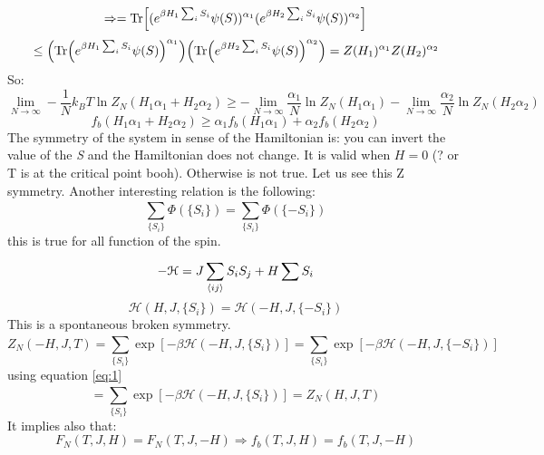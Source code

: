 \documentclass[../main/main.tex]{subfiles}
\begin{document}
\begin{equation}
  \Rightarrow = \Tr[ (e^{\beta H_1 \sum_{i}^{} S_i } \psi (S))^{\alpha _1} (e^{\beta H_2 \sum_{i}^{} S_i } \psi (S))^{\alpha _2}]
\end{equation}
\begin{equation}
  \le \qty(\Tr (e^{\beta H_1 \sum_{i}^{} S_i } \psi (S))^{\alpha _1}  ) \qty(\Tr (e^{\beta H_2 \sum_{i}^{} S_i } \psi (S))^{\alpha _2}  ) = Z(H_1)^{\alpha _1} Z(H_2)^{\alpha _2}
\end{equation}
So:
\begin{equation}
  \lim_{N \rightarrow \infty } - \frac{1}{N} k_B T \ln{Z_N (H_1 \alpha _1 + H_2 \alpha _2)} \ge - \lim_{N \rightarrow \infty } \frac{\alpha _1}{N} \ln{Z_N (H_1 \alpha _1)} -
  \lim_{N \rightarrow \infty } \frac{\alpha _2}{N} \ln{Z_N (H_2 \alpha _2)}
\end{equation}
\begin{equation}
  f_b (H_1 \alpha _1 + H_2 \alpha _2) \ge \alpha _1 f_b (H_1 \alpha _1) +  \alpha _2 f_b (H_2 \alpha _2)
\end{equation}
The symmetry of the system in sense of the Hamiltonian is: you can invert the value of the \emph{S} and the Hamiltonian does not change. It is valid when \( H=0 \) (? or T is at the critical point booh). Otherwise is not true. Let us see this Z symmetry.
Another interesting relation is the following:
\begin{equation}
  \sum_{ \{S_i\}}^{}  \Phi  (\{S_i\} ) =   \sum_{ \{S_i\}}^{}  \Phi  (\{-S_i\} )
    \label{eq:1}
\end{equation}
this is true for all function of the spin.
\begin{equation}
  - \mathcal{H} = J \sum_{\expval{ij} }^{} S_i S_j + H \sum_{}^{} S_i
\end{equation}
\begin{equation}
  \mathcal{H}(H,J, \{S_i\}) =   \mathcal{H}(-H,J, \{-S_i\})
\end{equation}
This is a spontaneous broken symmetry.
\begin{equation}
Z_N (-H,J,T) = \sum_{ \{S_i\}}^{} \exp [-\beta \mathcal{H} (-H,J, \{S_i\})]  =   \sum_{ \{S_i\}}^{} \exp [-\beta \mathcal{H} (-H,J,\{-S_i\})]
\end{equation}
using equation \eqref{eq:1}
\begin{equation}
  = \sum_{ \{S_i\}}^{} \exp [-\beta \mathcal{H} (-H,J, \{S_i\}) ] = Z_N (H,J,T)
\end{equation}
It implies also that:
\begin{equation}
  F_N (T,J,H) = F_N (T,J,-H) \Rightarrow f_b (T,J,H) = f_b (T,J,-H)
  \label{eq:2}
\end{equation}
\end{document}
